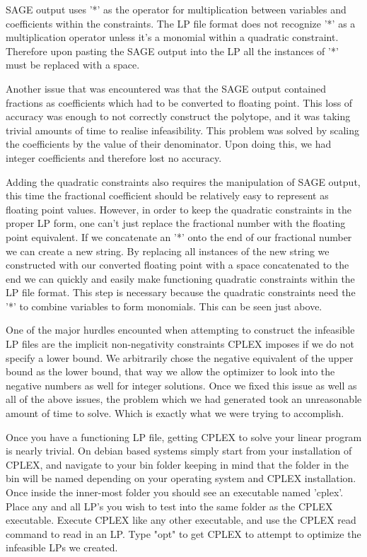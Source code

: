 \documentclass[11pt]{article} %
\theoremstyle{definition}
\theoremstyle{remark}
\begin{document}
SAGE output uses '*' as the operator for multiplication between variables and coefficients within the constraints. The LP file format does not recognize '*' as a multiplication operator unless it's a monomial within a quadratic constraint. Therefore upon pasting the SAGE output into the LP all the instances of '*' must be replaced with a space. 

Another issue that was encountered was that the SAGE output contained fractions as coefficients which had to be converted to floating point. This loss of accuracy was enough to not correctly construct the polytope, and it was taking trivial amounts of time to realise infeasibility. This problem was solved by scaling the coefficients by the value of their denominator. Upon doing this, we had integer coefficients and therefore lost no accuracy.

Adding the quadratic constraints also requires the manipulation of SAGE output, this time the fractional coefficient should be relatively easy to represent as floating point values. However, in order to keep the quadratic constraints in the proper LP form, one can't just replace the fractional number with the floating point equivalent. If we concatenate an '*' onto the end of our fractional number we can create a new string. By replacing all instances of the new string we constructed with our converted floating point with a space concatenated to the end we can quickly and easily make functioning quadratic constraints within the LP file format. This step is necessary because the quadratic constraints need the '*' to combine variables to form monomials. This can be seen just above. 

One of the major hurdles encounted when attempting to construct the infeasible LP files are the implicit non-negativity constraints CPLEX imposes if we do not specify a lower bound.
We arbitrarily chose the negative equivalent of the upper bound as the lower bound, that way we allow the optimizer to look into the negative numbers as well for integer solutions. Once we fixed this issue as well as all of the above issues, the problem which we had generated took an unreasonable amount of time to solve. Which is exactly what we were trying to accomplish.

Once you have a functioning LP file, getting CPLEX to solve your linear program is nearly trivial. On debian based systems simply start from your installation of CPLEX, and navigate to your bin folder keeping in mind that the folder in the bin will be named depending on your operating system and CPLEX installation. Once inside the inner-most folder you should see an executable named 'cplex'. Place any and all LP's you wish to test into the same folder as the CPLEX executable. Execute CPLEX like any other executable, and use the CPLEX read command to read in an LP. Type "opt" to get CPLEX to attempt to optimize the infeasible LPs we created. 
\end{document}
